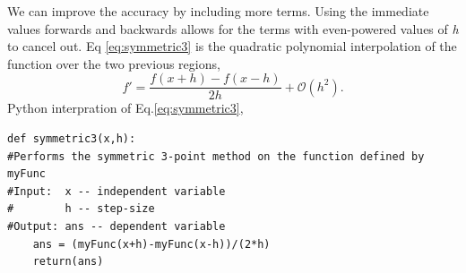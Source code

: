 \documentclass[10pt]{article}
\begin{document}
We can improve the accuracy by including more terms. Using the immediate values forwards and backwards allows for the terms with even-powered values of \textit{h} to cancel out. Eq \ref{eq:symmetric3} is the quadratic polynomial interpolation of the function over the two previous regions,
\begin{equation}
\label{eq:symmetric3}
	f'=\frac{f(x+h)-f(x-h)}{2h} + \mathcal{O}(h^2).
\end{equation} 
Python interpration of Eq.\ref{eq:symmetric3},
\begin{lstlisting}
def symmetric3(x,h):
#Performs the symmetric 3-point method on the function defined by myFunc
#Input:  x -- independent variable
#        h -- step-size
#Output: ans -- dependent variable
    ans = (myFunc(x+h)-myFunc(x-h))/(2*h)
    return(ans)
\end{lstlisting}
\end{document}
